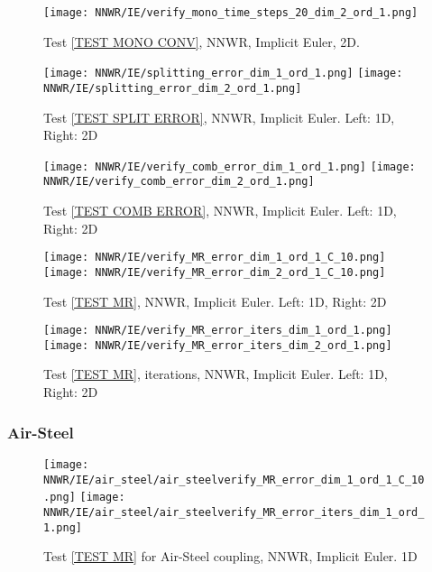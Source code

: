 \documentclass[a4paper,10pt]{article}
\begin{document}
\begin{figure}[!ht]
\texttt{[image: NNWR/IE/verify\_mono\_time\_steps\_20\_dim\_2\_ord\_1.png]}
\caption{Test \ref{TEST MONO CONV}, NNWR, Implicit Euler, 2D.}
\label{FIG NNWR IE 2D MONO CONV}
\end{figure}

\begin{figure}[!ht]
\texttt{[image: NNWR/IE/splitting\_error\_dim\_1\_ord\_1.png]}
\texttt{[image: NNWR/IE/splitting\_error\_dim\_2\_ord\_1.png]}
\caption{Test \ref{TEST SPLIT ERROR}, NNWR, Implicit Euler. Left: 1D, Right: 2D}
\label{FIG NNWR IE SPLIT ERROR}
\end{figure}

\begin{figure}[!ht]
\texttt{[image: NNWR/IE/verify\_comb\_error\_dim\_1\_ord\_1.png]}
\texttt{[image: NNWR/IE/verify\_comb\_error\_dim\_2\_ord\_1.png]}
\caption{Test \ref{TEST COMB ERROR}, NNWR, Implicit Euler. Left: 1D, Right: 2D}
\label{FIG NNWR IE COMB ERROR}
\end{figure}

\begin{figure}[!ht]
\texttt{[image: NNWR/IE/verify\_MR\_error\_dim\_1\_ord\_1\_C\_10.png]}
\texttt{[image: NNWR/IE/verify\_MR\_error\_dim\_2\_ord\_1\_C\_10.png]}
\caption{Test \ref{TEST MR}, NNWR, Implicit Euler. Left: 1D, Right: 2D}
\label{FIG NNWR IE MR ERROR}
\end{figure}

\begin{figure}[!ht]
\texttt{[image: NNWR/IE/verify\_MR\_error\_iters\_dim\_1\_ord\_1.png]}
\texttt{[image: NNWR/IE/verify\_MR\_error\_iters\_dim\_2\_ord\_1.png]}
\caption{Test \ref{TEST MR}, iterations, NNWR, Implicit Euler. Left: 1D, Right: 2D}
\label{FIG NNWR IE MR ITERS}
\end{figure}
% 
\FloatBarrier
\subsubsection{Air-Steel}\label{SEC NNWR IE AIR STEEL}
%

\begin{figure}[!ht]
\texttt{[image: NNWR/IE/air\_steel/air\_steelverify\_MR\_error\_dim\_1\_ord\_1\_C\_10.png]}
\texttt{[image: NNWR/IE/air\_steel/air\_steelverify\_MR\_error\_iters\_dim\_1\_ord\_1.png]}
\caption{Test \ref{TEST MR} for Air-Steel coupling, NNWR, Implicit Euler. 1D}
\label{FIG NNWR IE AIR STEEL 1D}
\end{figure}
\end{document}
